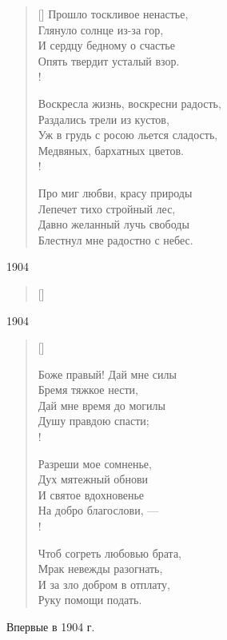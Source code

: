 \settowidth{\versewidth}{Прошло тоскливое ненастье}
\begin{verse}[\versewidth]
Прошло тоскливое ненастье,\\
Глянуло солнце из-за гор,\\
И сердцу бедному о счастье\\
Опять твердит усталый взор.\\!

Воскресла жизнь, воскресни радость,\\
Раздались трели из кустов,\\
Уж в грудь с росою льется сладость,\\
Медвяных, бархатных цветов.\\!

Про миг любви, красу природы\\
Лепечет тихо стройный лес,\\
Давно желанный лучь свободы\\
Блестнул мне радостно с небес.
\end{verse}
1904

\poemtitle{}
\settowidth{\versewidth}{}
\begin{verse}[\versewidth]
\indentpattern{}
\begin{patverse*}
\end{patverse*}
\end{verse}
1904



\settowidth{\versewidth}{Боже правый! Дай мне силы}
\begin{verse}[\versewidth]
\begin{altverse}
Боже правый! Дай мне силы\\
    Бремя тяжкое нести,\\
Дай мне время до могилы\\
    Душу правдою спасти;\\!

Разреши мое сомненье,\\
    Дух мятежный обнови\\
И святое вдохновенье\\
    На добро благослови, ---\\!

Чтоб согреть любовью брата,\\
    Мрак невежды разогнать,\\
И за зло добром в отплату,\\
    Руку помощи подать.
\end{altverse}
\end{verse}
Впервые в 1904 г.


